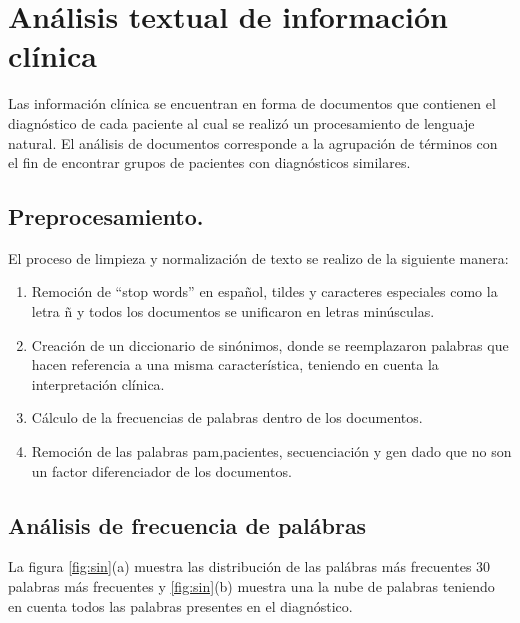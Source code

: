 \section{Análisis textual de información clínica}

Las información clínica se encuentran en forma de documentos que contienen el diagnóstico de cada paciente al cual se realizó un procesamiento de lenguaje natural. El análisis de documentos corresponde a la agrupación de términos con el fin de encontrar grupos de pacientes con diagnósticos similares.
 
\subsection{Preprocesamiento.}
    
El proceso de limpieza y normalización de texto se realizo de la siguiente manera:

 \begin{enumerate}
 	\item Remoción de ``stop words'' en español, tildes y caracteres especiales como la letra ñ y todos los documentos se unificaron en letras minúsculas.
 	\item Creación de un diccionario de sinónimos, donde se reemplazaron palabras que hacen referencia a una misma característica, teniendo en cuenta la interpretación clínica. 
 	\item Cálculo de la frecuencias de palabras dentro de los documentos. 
 	\item Remoción de las palabras pam,pacientes, secuenciación y gen dado que no son un factor diferenciador de los documentos.  	  
 \end{enumerate}

\subsection{Análisis de frecuencia de palábras}

La figura \ref{fig:sin}(a) muestra las distribución de las palábras más frecuentes 30 palabras más frecuentes y \ref{fig:sin}(b) muestra una la nube de palabras teniendo en cuenta todos las palabras presentes en el diagnóstico.\\

